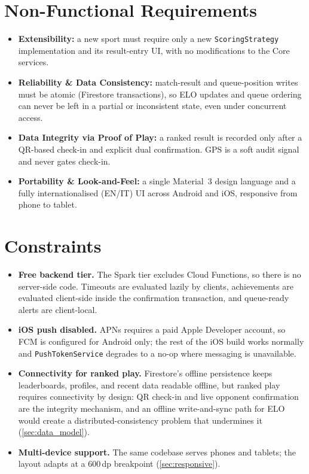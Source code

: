 \documentclass{configurations/polimi3i_thesis}
\renewcommand{\_}{\textunderscore\allowbreak}
\begin{document}
\section{Non-Functional Requirements}
\label{sec:non_functional_requirements}

\begin{itemize}
    \item \textbf{Extensibility:} a new sport must require only a new \texttt{ScoringStrategy} implementation and its result-entry UI, with no modifications to the Core services.
    \item \textbf{Reliability \& Data Consistency:} match-result and queue-position writes must be atomic (Firestore transactions), so ELO updates and queue ordering can never be left in a partial or inconsistent state, even under concurrent access.
    \item \textbf{Data Integrity via Proof of Play:} a ranked result is recorded only after a QR-based check-in and explicit dual confirmation. GPS is a soft audit signal and never gates check-in.
    \item \textbf{Portability \& Look-and-Feel:} a single Material~3 design language and a fully internationalised (EN/IT) UI across Android and iOS, responsive from phone to tablet.
\end{itemize}

\section{Constraints}
\label{sec:constraints}

\begin{itemize}
    \item \textbf{Free backend tier.} The Spark tier excludes Cloud Functions, so there is no server-side code. Timeouts are evaluated lazily by clients, achievements are evaluated client-side inside the confirmation transaction, and queue-ready alerts are client-local.
    \item \textbf{iOS push disabled.} APNs requires a paid Apple Developer account, so FCM is configured for Android only; the rest of the iOS build works normally and \texttt{PushTokenService} degrades to a no-op where messaging is unavailable.
    \item \textbf{Connectivity for ranked play.} Firestore's offline persistence keeps leaderboards, profiles, and recent data readable offline, but ranked play requires connectivity by design: QR check-in and live opponent confirmation are the integrity mechanism, and an offline write-and-sync path for ELO would create a distributed-consistency problem that undermines it (\cref{sec:data_model}).
    \item \textbf{Multi-device support.} The same codebase serves phones and tablets; the layout adapts at a 600\,dp breakpoint (\cref{sec:responsive}).
\end{itemize}
\end{document}
